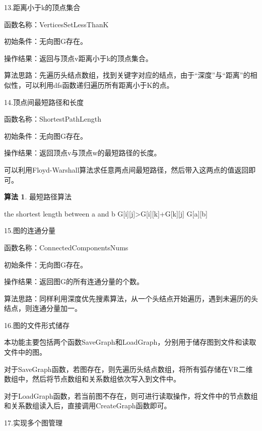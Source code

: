 \documentclass[supercite]{Experimental_Report}
\theoremstyle{definition}
\newtheorem{alg}{算法}[section]
\begin{document}
13.距离小于k的顶点集合

函数名称：VerticesSetLessThanK

初始条件：无向图G存在。

操作结果：返回与顶点v距离小于k的顶点集合。

算法思路：先遍历头结点数组，找到关键字对应的结点，由于“深度”与“距离”的相似性，可以利用dfs函数递归遍历所有距离小于K的点。

14.顶点间最短路径和长度

函数名称：ShortestPathLength

初始条件：无向图G存在。

操作结果：返回顶点v与顶点w的最短路径的长度。

可以利用Floyd-Warshall算法求任意两点间最短路径，然后带入这两点的值返回即可。

\begin{shaded*}\begin{alg}{最短路径算法}
	\label{alg:6}
	\begin{algorithmic}
		\Output the shortest length between a and b
						\State G[i][j]>G[i][k]+G[k][j]
					\EndIf
				\EndFor
			\EndFor
		\EndFor
		\State \Return G[a][b]
		\EndProcedure
	\end{algorithmic}
\end{alg}\end{shaded*}

15.图的连通分量

函数名称：ConnectedComponentsNums

初始条件：无向图G存在。

操作结果：返回图G的所有连通分量的个数。

算法思路：同样利用深度优先搜素算法，从一个头结点开始遍历，遇到未遍历的头结点，则连通分量加一。

16.图的文件形式储存

本功能主要包括两个函数SaveGraph和LoadGraph，分别用于储存图到文件和读取文件中的图。

对于SaveGraph函数，若图存在，则先遍历头结点数组，将所有弧存储在VR二维数组中，然后将节点数组和关系数组依次写入到文件中。

对于LoadGraph函数，若当前图不存在，则可进行读取操作，将文件中的节点数组和关系数组读入后，直接调用CreateGraph函数即可。

17.实现多个图管理
\end{document}
